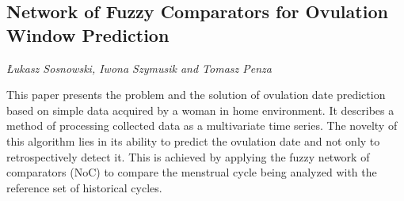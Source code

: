 \documentclass[../booklet.tex]{subfiles}
\begin{document}
\subsection[Network of Fuzzy Comparators for Ovulation Window Prediction. {\it Łukasz Sosnowski, Iwona Szymusik and Tomasz Penza}]{Network of Fuzzy Comparators for Ovulation Window Prediction}
  

\begin{center}
  {\it Łukasz Sosnowski, Iwona Szymusik and Tomasz Penza}
\end{center}



This paper presents the problem and the solution of ovulation date prediction based on simple data acquired by a woman in home environment. It describes a method of processing collected data as a multivariate time series. The novelty of this algorithm lies in its ability to predict the ovulation date and not only to retrospectively detect it. This is achieved by applying the fuzzy network of comparators (NoC) to compare the menstrual cycle being analyzed with the reference set of historical cycles. 

\end{document}
